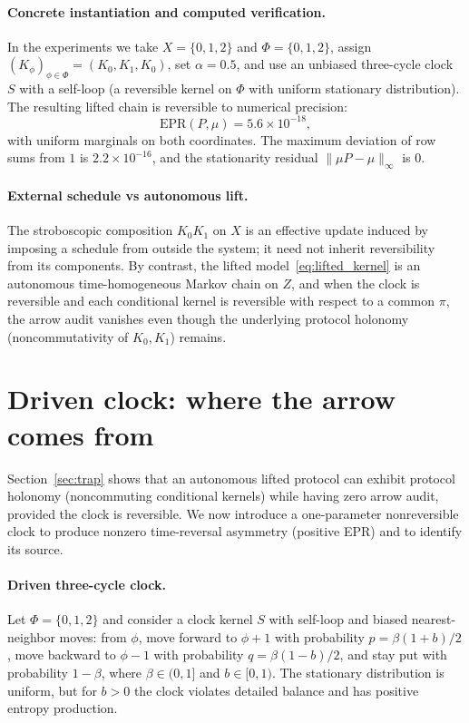 \documentclass[11pt]{article}
\newcommand{\AlphaDefault}{0.5}
\newcommand{\StationarityResidual}{0}
\newcommand{\EprLiftedUnbiasedRound}{\ensuremath{5.6\times 10^{-18}}}
\newcommand{\RowSumMaxDevRound}{\ensuremath{2.2\times 10^{-16}}}
\begin{document}
\paragraph{Concrete instantiation and computed verification.}
In the experiments we take \(X=\{0,1,2\}\) and \(\Phi=\{0,1,2\}\), assign \((K_\phi)_{\phi\in\Phi}=(K_0,K_1,K_0)\), set \(\alpha=\AlphaDefault\), and use an unbiased three-cycle clock \(S\) with a self-loop (a reversible kernel on \(\Phi\) with uniform stationary distribution).
The resulting lifted chain is reversible to numerical precision:
\[
\mathrm{EPR}(P,\mu)=\EprLiftedUnbiasedRound,
\]
with uniform marginals on both coordinates.
The maximum deviation of row sums from \(1\) is \(\RowSumMaxDevRound\), and the stationarity residual \(\|\mu P-\mu\|_\infty\) is \(\StationarityResidual\).

\paragraph{External schedule vs autonomous lift.}
The stroboscopic composition \(K_0K_1\) on \(X\) is an effective update induced by imposing a schedule from outside the system; it need not inherit reversibility from its components. By contrast, the lifted model~\eqref{eq:lifted_kernel} is an autonomous time-homogeneous Markov chain on \(Z\), and when the clock is reversible and each conditional kernel is reversible with respect to a common \(\pi\), the arrow audit vanishes even though the underlying protocol holonomy (noncommutativity of \(K_0,K_1\)) remains.
 \section{Driven clock: where the arrow comes from}\label{sec:driven}

Section~\ref{sec:trap} shows that an autonomous lifted protocol can exhibit protocol holonomy (noncommuting conditional kernels) while having zero arrow audit, provided the clock is reversible. We now introduce a one-parameter nonreversible clock to produce nonzero time-reversal asymmetry (positive EPR) and to identify its source.

\paragraph{Driven three-cycle clock.}
Let \(\Phi=\{0,1,2\}\) and consider a clock kernel \(S\) with self-loop and biased nearest-neighbor moves:
from \(\phi\), move forward to \(\phi+1\) with probability \(p=\beta(1+b)/2\), move backward to \(\phi-1\) with probability \(q=\beta(1-b)/2\), and stay put with probability \(1-\beta\), where \(\beta\in(0,1]\) and \(b\in[0,1)\).
The stationary distribution is uniform, but for \(b>0\) the clock violates detailed balance and has positive entropy production.
\end{document}
